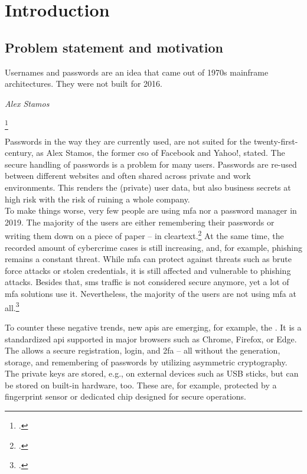 \chapter{Introduction}
\label{chapter:introduction}

\section{Problem statement and motivation}

\setlength{}
\epigraph{\frqq Usernames and passwords are an idea that came out of 1970s mainframe architectures. They were not built for 2016.\flqq\footnotemark}{\textit{Alex Stamos}}
\footcitetext[See][]{stamos}

Passwords in the way they are currently used, are not suited for the twenty-first-century, as Alex Stamos, the former \gls{cso} of Facebook and Yahoo!, stated. The secure handling of passwords is a problem for many users. Passwords are re-used between different websites and often shared across private and work environments. This renders the (private) user data, but also business secrets at high risk with the risk of ruining a whole company.\\
To make things worse, very few people are using \gls{mfa} nor a password manager in 2019. The majority of the users are either remembering their passwords or writing them down on a piece of paper -- in cleartext.\footcites[See][]{ibm-security}[See][]{web-de-passwords}
At the same time, the recorded amount of cybercrime cases is still increasing, and, for example, phishing remains a constant threat. While \gls{mfa} can protect against threats such as brute force attacks or stolen credentials, it is still affected and vulnerable to phishing attacks. Besides that, \gls{sms} traffic is not considered secure anymore, yet a lot of \gls{mfa} solutions use it. Nevertheless, the majority of the users are not using \gls{mfa} at all.\footcites[See][]{infratest-dimap}[See][6--7]{bka-cybercrime}

To counter these negative trends, new \glspl{api} are emerging, for example, the \wa. It is a standardized \gls{api} supported in major browsers such as Chrome, Firefox, or Edge. The \wa{} allows a secure registration, login, and \gls{2fa} -- all without the generation, storage, and remembering of passwords by utilizing asymmetric cryptography. The private keys are stored, e.g., on external devices such as USB sticks, but can be stored on built-in hardware, too. These are, for example, protected by a fingerprint sensor or dedicated chip designed for secure operations.

